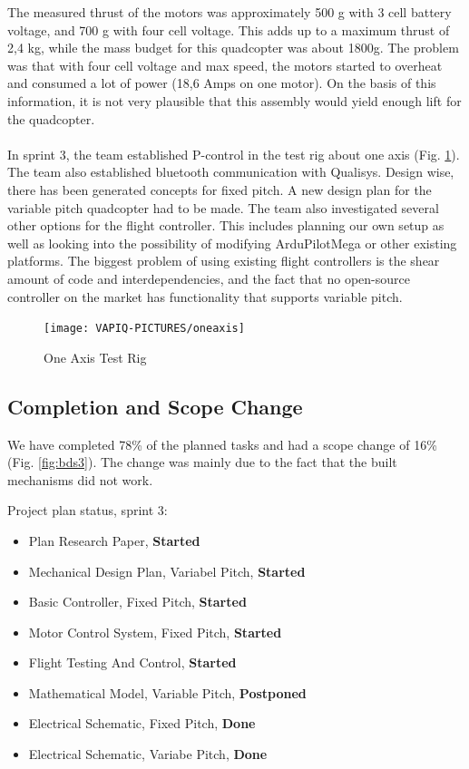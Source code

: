 The measured thrust of the motors was approximately 500 g with 3 cell battery voltage, and 700 g with four cell voltage. This adds up to a maximum thrust of 2,4 kg, while the mass budget for this quadcopter was about 1800g. The problem was that with four cell voltage and max speed, the motors started to overheat and consumed a lot of power (18,6 Amps on one motor). On the basis of this information, it is not very plausible that this assembly would yield enough lift for the quadcopter. \\
\\
In sprint 3, the team established P-control in the test rig about one axis (Fig. \ref{fig:oneaxis}). The team also established bluetooth communication with Qualisys. Design wise, there has been generated concepts for fixed pitch. A new design plan for the variable pitch quadcopter had to be made. The team also investigated several other options for the flight controller. This includes planning our own setup as well as looking into the possibility of modifying ArduPilotMega or other existing platforms. The biggest problem of using existing flight controllers is the shear amount of code and interdependencies, and the fact that no open-source controller on the market has functionality that supports variable pitch. 

\begin{figure}[h]
        \centering
        \texttt{[image: VAPIQ-PICTURES/oneaxis]}
        \caption{One Axis Test Rig}
        \label{fig:oneaxis}
\end{figure}
  

\newpage
\subsection{Completion and Scope Change}

We have completed 78\% of the planned tasks and had a scope change of 16\% (Fig. \ref{fig:bds3}). The change was mainly due to the fact that the built mechanisms did not work.

Project plan status, sprint 3:

\begin{itemize}
    \item Plan Research Paper, \textbf{Started}
    \item Mechanical Design Plan, Variabel Pitch, \textbf{Started}
    \item Basic Controller, Fixed Pitch, \textbf{Started}
    \item Motor Control System, Fixed Pitch, \textbf{Started}
    \item Flight Testing And Control, \textbf{Started}
    \item Mathematical Model, Variable Pitch, \textbf{Postponed}
    \item Electrical Schematic, Fixed Pitch, \textbf{Done}
    \item Electrical Schematic, Variabe Pitch, \textbf{Done}
\end{itemize}


